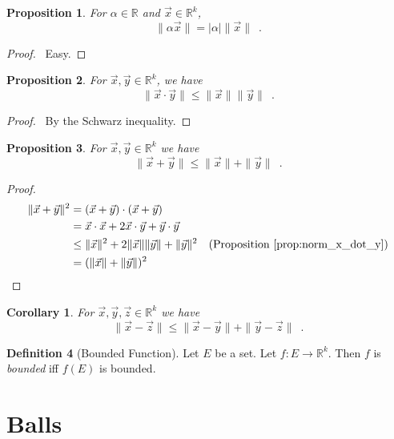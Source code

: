 \documentclass{book}
\let\qed\relax
\newtheorem{prop}{Proposition}[chapter]
\newtheorem{cor}{Corollary}[prop]
\theoremstyle{definition}
\newtheorem{df}[prop]{Definition}
\begin{document}
\begin{prop}
For $\alpha \in \mathbb{R}$ and $\vec{x} \in \mathbb{R}^k$,
\[ \| \alpha \vec{x} \| = |\alpha| \| \vec{x} \| \enspace . \]
\end{prop}

\begin{proof}
\pf\ Easy. \qed
\end{proof}

\begin{prop}
\label{prop:norm_x_dot_y}
For $\vec{x}, \vec{y} \in \mathbb{R}^k$, we have
\[ \| \vec{x} \cdot \vec{y} \| \leq \| \vec{x} \| \| \vec{y} \| \enspace . \]
\end{prop}

\begin{proof}
\pf\ By the Schwarz inequality. \qed
\end{proof}

\begin{prop}
For $\vec{x}, \vec{y} \in \mathbb{R}^k$ we have
\[ \| \vec{x} + \vec{y} \| \leq \| \vec{x} \| + \| \vec{y} \| \enspace . \]
\end{prop}

\begin{proof}
\pf
\begin{align*}
\| \vec{x} + \vec{y} \|^2 & = (\vec{x} + \vec{y}) \cdot (\vec{x} + \vec{y}) \\
& = \vec{x} \cdot \vec{x} + 2 \vec{x} \cdot \vec{y} + \vec{y} \cdot \vec{y} \\
& \leq \| \vec{x} \|^2 + 2 \| \vec{x} \| \| \vec{y} \| + \| \vec{y} \|^2 & (\text{Proposition \ref{prop:norm_x_dot_y}}) \\
& = (\| \vec{x} \| + \| \vec{y} \|)^2 & \qed
\end{align*}
\end{proof}

\begin{cor}
\label{cor:triangle_inequality}
For $\vec{x}, \vec{y}, \vec{z} \in \mathbb{R}^k$ we have
\[ \| \vec{x} - \vec{z} \| \leq \| \vec{x} - \vec{y} \| + \| \vec{y} - \vec{z} \| \enspace . \]
\end{cor}

\begin{df}[Bounded Function]
Let $E$ be a set. Let $f : E \rightarrow \mathbb{R}^k$. Then $f$ is \emph{bounded} iff $f(E)$ is bounded.
\end{df}

\section{Balls}
\end{document}
